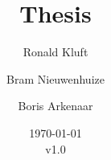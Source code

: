 \documentclass{report}
\begin{document}
\title{Thesis}
\author{Ronald Kluft \and Bram Nieuwenhuize \and Boris Arkenaar}
\date{\today\\v1.0}
\maketitle
\tableofcontents


%
%
%



\printglossaries
\end{document}
